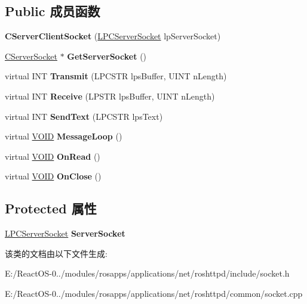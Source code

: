 \subsection*{Public 成员函数}
\begin{DoxyCompactItemize}
\item 
\mbox{\label{class_c_server_client_socket_acc05d63a5a31811de03dc9576d669367}} 
{\bfseries C\+Server\+Client\+Socket} (\hyperlink{class_c_server_socket}{L\+P\+C\+Server\+Socket} lp\+Server\+Socket)
\item 
\mbox{\label{class_c_server_client_socket_a46598e9001ffad2a22da5563b311890f}} 
\hyperlink{class_c_server_socket}{C\+Server\+Socket} $\ast$ {\bfseries Get\+Server\+Socket} ()
\item 
\mbox{\label{class_c_server_client_socket_a53411f42d62449d0a7513956ca938c2a}} 
virtual I\+NT {\bfseries Transmit} (L\+P\+C\+S\+TR lps\+Buffer, U\+I\+NT n\+Length)
\item 
\mbox{\label{class_c_server_client_socket_a0a5aac59f67a6148b2b45fdc8d15c1d1}} 
virtual I\+NT {\bfseries Receive} (L\+P\+S\+TR lps\+Buffer, U\+I\+NT n\+Length)
\item 
\mbox{\label{class_c_server_client_socket_a9fa1a7de2c14251b58f0cba1834c549c}} 
virtual I\+NT {\bfseries Send\+Text} (L\+P\+C\+S\+TR lps\+Text)
\item 
\mbox{\label{class_c_server_client_socket_ac23574f96be5d62aee13be14a9785453}} 
virtual \hyperlink{interfacevoid}{V\+O\+ID} {\bfseries Message\+Loop} ()
\item 
\mbox{\label{class_c_server_client_socket_ad225a0604c9e56197110b1307663af5c}} 
virtual \hyperlink{interfacevoid}{V\+O\+ID} {\bfseries On\+Read} ()
\item 
\mbox{\label{class_c_server_client_socket_a1f886f8f06982df4e41d9425e4f1074f}} 
virtual \hyperlink{interfacevoid}{V\+O\+ID} {\bfseries On\+Close} ()
\end{DoxyCompactItemize}
\subsection*{Protected 属性}
\begin{DoxyCompactItemize}
\item 
\mbox{\label{class_c_server_client_socket_a19395d81945c1fd79e1757939186c941}} 
\hyperlink{class_c_server_socket}{L\+P\+C\+Server\+Socket} {\bfseries Server\+Socket}
\end{DoxyCompactItemize}


该类的文档由以下文件生成\+:\begin{DoxyCompactItemize}
\item 
E\+:/\+React\+O\+S-\/0../modules/rosapps/applications/net/roshttpd/include/socket.\+h\item 
E\+:/\+React\+O\+S-\/0../modules/rosapps/applications/net/roshttpd/common/socket.\+cpp\end{DoxyCompactItemize}
